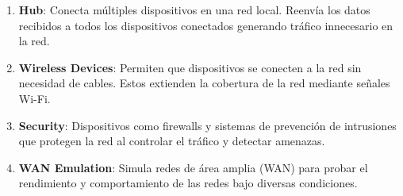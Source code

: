 \documentclass{article}
\begin{document}
\begin{enumerate}
\begin{itemize}
\begin{itemize}
                \end{itemize}
            \end{itemize}
            \item\textbf{Hub}: Conecta múltiples dispositivos en una red local. Reenvía los datos recibidos a todos los dispositivos conectados generando tráfico innecesario en la red.  
            \item\textbf{Wireless Devices}: Permiten que dispositivos se conecten a la red sin necesidad de cables. Estos extienden la cobertura de la red mediante señales Wi-Fi.  
            \item\textbf{Security}: Dispositivos como firewalls y sistemas de prevención de intrusiones que protegen la red al controlar el tráfico y detectar amenazas.  
            \item\textbf{WAN Emulation}: Simula redes de área amplia (WAN) para probar el rendimiento y comportamiento de las redes bajo diversas condiciones. 
        \end{enumerate}
        
\end{document}
